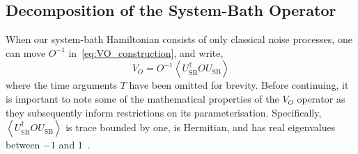 \documentclass[12pt]{iopart}
\begin{document}
\subsection{Decomposition of the System-Bath Operator \label{subsec:decomposition_of_vo}}
When our system-bath Hamiltonian consists of only classical noise processes, one can move $O^{-1}$ in~\cref{eq:VO_construction}, and write,
\begin{equation} \label{eq:VO_construction_1}
    V_O=O^{-1}\left\langle U_{\mathrm{SB}}^{\dagger} O U_{\mathrm{SB}}\right\rangle
\end{equation}
where the time arguments $T$ have been omitted for brevity. Before continuing, it is important to note some of the mathematical properties of the $V_O$ operator as they subsequently inform restrictions on its parameterisation. Specifically, $\left\langle U_{\mathrm{SB}}^{\dagger} O U_{\mathrm{SB}}\right\rangle$ is trace bounded by one, is Hermitian, and has real eigenvalues between $-1$ and $1$~\cite{youssry2020characterization}.

\end{document}
